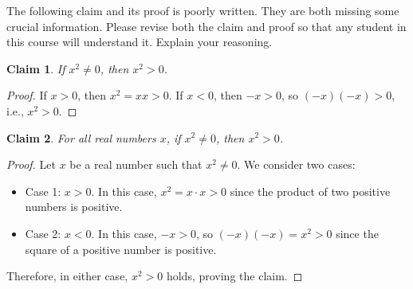 \documentclass{article}
\newtheorem*{claim}{Claim}
\theoremstyle{definition}
\begin{document}
\begin{question}
   The following claim and its proof is poorly written. They are both missing some crucial information. 
   Please revise both the claim and proof so that any student in this course will understand it. Explain your reasoning.
      \begin{claim}
       If $x^2\neq 0$, then $x^2>0$.
      \end{claim}
      \begin{proof}
       If $x>0$, then $x^2=xx>0$. If $x<0$, then $-x>0$, so $(-x)(-x)>0$, i.e., $x^2>0$.
      \end{proof}
\end{question}
\begin{solution}
    \begin{claim}
       For all real numbers $x$, if $x^2 \neq 0$, then $x^2 > 0$.
    \end{claim}
    \begin{proof}
       Let $x$ be a real number such that $x^2 \neq 0$. We consider two cases:
       \begin{itemize}
           \item Case 1: $x > 0$. In this case, $x^2 = x \cdot x > 0$ since the product of two positive numbers is positive.
           \item Case 2: $x < 0$. In this case, $-x > 0$, so $(-x)(-x) = x^2 > 0$ since the square of a positive number is positive.
       \end{itemize}
       Therefore, in either case, $x^2 > 0$ holds, proving the claim.
    \end{proof}
\end{solution}
\end{document}

